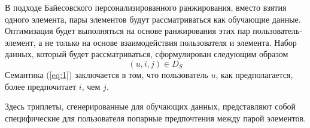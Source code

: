      В подходе Байесовского
      персонализированного ранжирования, вместо взятия одного элемента, 
      пары элементов будут рассматриваться как обучающие данные. Оптимизация
       будет выполняться на основе ранжирования этих пар пользователь-элемент,
        а не только на основе взаимодействия пользователя и элемента. Набор
         данных, который будет рассматриваться, сформулирован следующим
          образом 
          \begin{equation}
            (u,i,j) \in D_S
            \label{eq:1}
          \end{equation}
          Семантика (\ref{eq:1}) заключается в том, что пользователь ${u}$, как предполагается, более предпочитает ${i}$, чем ${j}$.
          \begin{figure}[ht]
            \begin{center}
            
            \caption{
            \label{BPR2}
                 }
            \end {center}
            \end {figure}

            Здесь триплеты, сгенерированные для обучающих данных, представляют собой специфические для пользователя попарные предпочтения между парой элементов.
            

